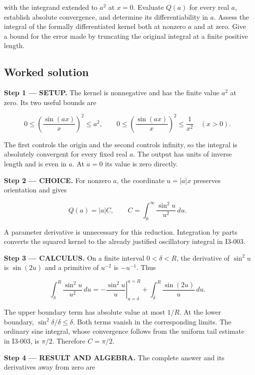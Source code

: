 \documentclass[11pt,oneside,openany]{book}
\begin{document}
with the integrand extended to \(a^2\) at \(x=0\). Evaluate \(Q(a)\) for every real \(a\), establish absolute convergence, and determine its differentiability in \(a\). Assess the integral of the formally differentiated kernel both at nonzero \(a\) and at zero. Give a bound for the error made by truncating the original integral at a finite positive length.
\subsection*{Worked solution}

\textbf{Step 1 --- SETUP.} The kernel is nonnegative and has the finite value \(a^2\) at zero. Its two useful bounds are

\[
0\le\left(\frac{\sin(ax)}x\right)^2\le a^2,
\qquad
0\le\left(\frac{\sin(ax)}x\right)^2\le\frac1{x^2}\quad(x>0).
\]

The first controls the origin and the second controls infinity, so the integral is absolutely convergent for every fixed real \(a\). The output has units of inverse length and is even in \(a\). At \(a=0\) its value is zero directly.

\begin{ChoiceStep}
\textbf{Step 2 --- CHOICE.} For nonzero \(a\), the coordinate \(u=|a|x\) preserves orientation and gives

\[
Q(a)=|a|C,\qquad C=\int_0^\infty\frac{\sin^2u}{u^2}\,du.
\]

A parameter derivative is unnecessary for this reduction. Integration by parts converts the squared kernel to the already justified oscillatory integral in I3-003.

\end{ChoiceStep}
\textbf{Step 3 --- CALCULUS.} On a finite interval \(0<\delta<R\), the derivative of \(\sin^2u\) is \(\sin(2u)\) and a primitive of \(u^{-2}\) is \(-u^{-1}\). Thus

\[
\int_\delta^R\frac{\sin^2u}{u^2}\,du
=\left.-\frac{\sin^2u}{u}\right|_{u=\delta}^{u=R}
+\int_\delta^R\frac{\sin(2u)}u\,du.
\]

The upper boundary term has absolute value at most \(1/R\). At the lower boundary, \(\sin^2\delta/\delta\le\delta\). Both terms vanish in the corresponding limits. The ordinary sine integral, whose convergence follows from the uniform tail estimate in I3-003, is \(\pi/2\). Therefore \(C=\pi/2\).

\textbf{Step 4 --- RESULT AND ALGEBRA.} The complete answer and its derivatives away from zero are
\end{document}
